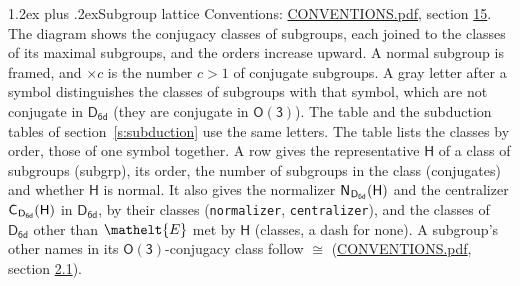 \documentclass[10pt,a4paper]{article}
\makeatletter
\renewcommand\section{\@startsection{section}{1}{\z@}{-3ex plus -1ex minus -.2ex}%
  {1.2ex plus .2ex}{\normalfont\large\sffamily\bfseries\color{parttitle}}}
\numberwithin{equation}{section}
\newcommand{\eltfont}[1]{{\let\sigma\eltsigma\mathelt{#1}}}
\newcommand{\grp}[1]{\mathsf{#1}}
\newcommand{\cls}[1]{\eltfont{#1}}
\newcommand{\samecls}{\cong}
\newcommand{\hairsp}{\mkern1mu}
\makeatother
\begin{document}
\section{Subgroup lattice}\label{s:subgroups}
Conventions: \href{../../CONVENTIONS.pdf}{CONVENTIONS.pdf}, section \href{../../CONVENTIONS.pdf\#conv.15}{15}.
The diagram shows the conjugacy classes of subgroups, each joined to the classes of its maximal subgroups, and the orders increase upward. A normal subgroup is framed, and ${\times}c$ is the number $c > 1$ of conjugate subgroups. A gray letter after a symbol distinguishes the classes of subgroups with that symbol, which are not conjugate in $\grp{D_{6d}}$ (they are conjugate in \href{O3.pdf}{$\grp{O(3)}$}). The table and the subduction tables of section~\ref{s:subduction} use the same letters. The table lists the classes by order, those of one symbol together. \label{n:group.H}\label{n:head.subgroup}\label{n:head.order}\label{n:head.conjugates}\label{n:head.normal}A row gives the representative $\grp{H}$ of a class of subgroups (subgrp), its order, the number of subgroups in the class (conjugates) and whether $\grp{H}$ is normal. \label{n:group.normalizer}\label{n:group.centralizer}\label{n:head.classes}It also gives the normalizer $\grp{N}_{\hairsp \grp{D_{6d}}}(\grp{H})$ and the centralizer $\grp{C}_{\hairsp \grp{D_{6d}}}(\grp{H})$ in $\grp{D_{6d}}$, by their classes (\texttt{normalizer}, \texttt{centralizer}), and the classes of $\grp{D_{6d}}$ other than $\cls{E}$ met by $\grp{H}$ (classes, a dash for none). A subgroup's other names in its \href{O3.pdf}{$\grp{O(3)}$}-conjugacy class follow $\samecls$ (\href{../../CONVENTIONS.pdf}{CONVENTIONS.pdf}, section \href{../../CONVENTIONS.pdf\#conv.2.1}{2.1}).
\end{document}
